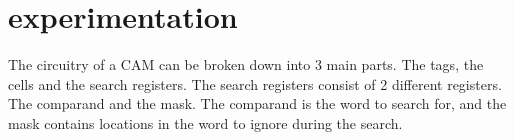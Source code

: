 \section{experimentation}
The circuitry of a CAM can be broken down into 3 main parts. The tags, the cells and the search registers. 
The search registers consist of 2 different registers. 
The comparand and the mask. The comparand is the word to search for, and the mask contains locations in the word to ignore during the search.
